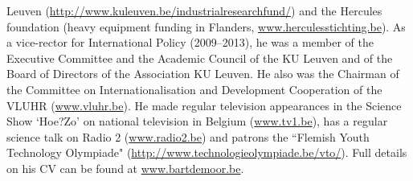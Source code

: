 \documentclass[preprint,elsarticle-num,12pt]{elsarticle}
\begin{document}
Leuven (\url{http://www.kuleuven.be/industrialresearchfund/}) and the Hercules foundation (heavy equipment funding in Flanders, \url{www.herculesstichting.be}). As a vice-rector for International Policy (2009--2013), he was a member of the Executive Committee and the Academic Council of the KU Leuven and of the Board of Directors of the Association KU Leuven. He also was the Chairman of the Committee on Internationalisation and Development Cooperation of the VLUHR (\url{www.vluhr.be}). He made regular television appearances in the Science Show ‘Hoe?Zo’ on national television in Belgium (\url{www.tv1.be}), has a regular science talk on Radio 2 (\url{www.radio2.be}) and patrons the ``Flemish Youth Technology Olympiade" (\url{http://www.technologieolympiade.be/vto/}). Full details on his CV can be found at \url{www.bartdemoor.be}.
\end{document}
